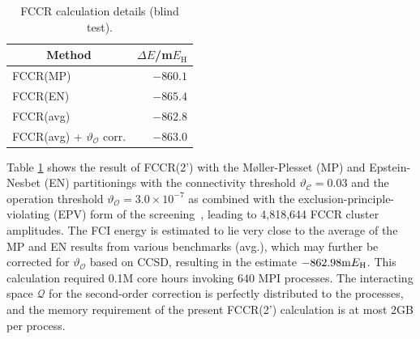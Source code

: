 \documentclass[journal=jcp,manuscript=suppinfo]{achemso}
\begin{document}
%
\begin{table}[ht!]
\begin{center}
\caption{FCCR calculation details (blind test).}
\label{fccr_SI_table}
\begin{tabular}{l|r}
\toprule
\multicolumn{1}{c|}{Method} & \multicolumn{1}{c}{$\Delta E$/m$E_{\text{H}}$} \\
\midrule\midrule
FCCR(MP) & $-860.1$ \\
FCCR(EN) & $-865.4$ \\
FCCR(avg) & $-862.8$ \\
FCCR(avg) + $\vartheta_{\mathcal O}$ corr. & $-863.0$ \\
\midrule
\end{tabular}
\vspace{-0.6cm}
\end{center}
\end{table}
%
Table \ref{fccr_SI_table} shows the result of FCCR(2') with the M{\o}ller-Plesset (MP) and Epstein-Nesbet (EN) partitionings with the connectivity threshold $\vartheta_{\mathcal C}=0.03$ and the operation threshold $\vartheta_{\mathcal O}=3.0 \times 10^{-7}$ as combined with the exclusion-principle-violating (EPV) form of the screening~\cite{ten_no_fcc_prl_2018}, leading to 4,818,644 FCCR cluster amplitudes. The FCI energy is estimated to lie very close to the average of the MP and EN results from various benchmarks (avg.), which may further be corrected for $\vartheta_{\mathcal O}$ based on CCSD, resulting in the estimate $-862.98 {\rm m}E_{\rm H}$. This calculation required 0.1M core hours invoking 640 MPI processes. The interacting space ${\mathcal Q}$ for the second-order correction is perfectly distributed to the processes, and the memory requirement of the present FCCR(2') calculation is at most 2GB per process.\\
\end{document}

